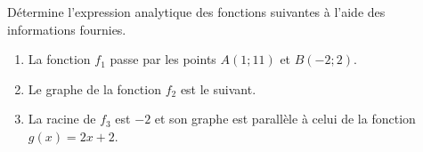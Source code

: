 %
%
    Détermine l'expression analytique des fonctions suivantes à l'aide des informations fournies.
    \begin{enumerate}
        \item La fonction $f_1$ passe par les points $A(1;11)$ et $B(-2;2)$.
        \item Le graphe de la fonction $f_2$ est le suivant. 
        \item La racine de $f_3$ est $-2$ et son graphe est parallèle à celui de la fonction $g(x) = 2x + 2$.
    \end{enumerate}
